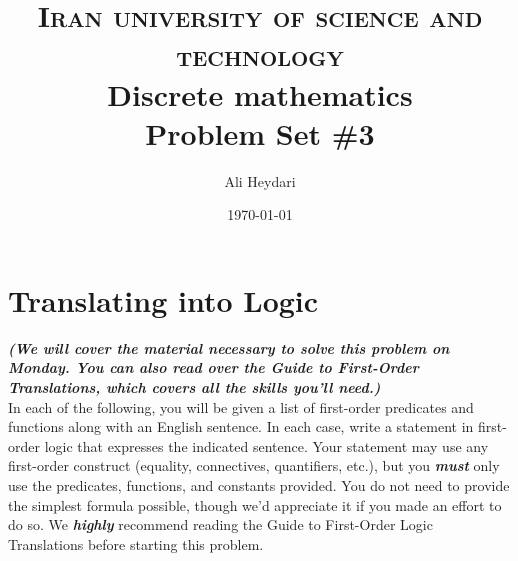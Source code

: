 \documentclass[a4paper]{article}
\title{
\textsc{Iran university of science and technology} \\ [25pt] %
Discrete mathematics\\Problem Set \#3 \\
}
\author{Ali Heydari}
\date{\today}
\renewcommand{\(}{\left(}
\renewcommand{\)}{\right)}
\theoremstyle{plain}
\theoremstyle{plain}
\theoremstyle{definition}
\begin{document}
\maketitle

\section{Translating into Logic}
\textit{\textbf{(We will cover the material necessary to solve this problem on Monday. You can also read over the Guide to
First-Order Translations, which covers all the skills you'll need.)}} \\

In each of the following,
you will be given a list of first-order predicates and functions
along with an English sentence.
In each case,
write a statement in first-order logic that expresses
the indicated sentence.
Your statement may use any first-order construct
(equality, connectives, quantifiers, etc.),
but you \textbf{\textit{must}} only use the predicates, functions,
and constants provided.
You do not need to provide the simplest formula
possible, though we'd appreciate it if you made an effort to do so. We \textit{\textbf{highly}} recommend reading the
Guide to First-Order Logic Translations before starting this problem.
\end{document}
